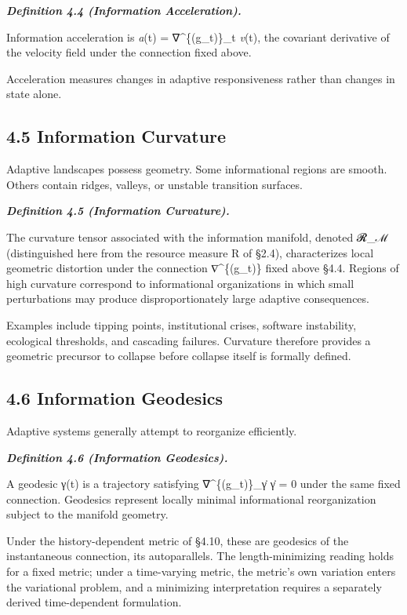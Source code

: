 \documentclass[
]{article}
\begin{document}
\emph{\textbf{Definition 4.4 (Information Acceleration).}}

Information acceleration is \emph{a}(t) = ∇\^{}\{(g\_t)\}\_t
\emph{v}(t), the covariant derivative of the velocity field under the
connection fixed above.

Acceleration measures changes in adaptive responsiveness rather than
changes in state alone.

\hypertarget{information-curvature}{%
\subsection{4.5 Information Curvature}\label{information-curvature}}

Adaptive landscapes possess geometry. Some informational regions are
smooth. Others contain ridges, valleys, or unstable transition surfaces.

\emph{\textbf{Definition 4.5 (Information Curvature).}}

The curvature tensor associated with the information manifold, denoted
𝓡\_ℳ (distinguished here from the resource measure R of §2.4),
characterizes local geometric distortion under the connection
∇\^{}\{(g\_t)\} fixed above §4.4. Regions of high curvature correspond
to informational organizations in which small perturbations may produce
disproportionately large adaptive consequences.

Examples include tipping points, institutional crises, software
instability, ecological thresholds, and cascading failures. Curvature
therefore provides a geometric precursor to collapse before collapse
itself is formally defined.

\hypertarget{information-geodesics}{%
\subsection{4.6 Information Geodesics}\label{information-geodesics}}

Adaptive systems generally attempt to reorganize efficiently.

\emph{\textbf{Definition 4.6 (Information Geodesics).}}

A geodesic γ(t) is a trajectory satisfying ∇\^{}\{(g\_t)\}\_γ̇ γ̇ = 0
under the same fixed connection. Geodesics represent locally minimal
informational reorganization subject to the manifold geometry.

Under the history-dependent metric of §4.10, these are geodesics of the
instantaneous connection, its autoparallels. The length-minimizing
reading holds for a fixed metric; under a time-varying metric, the
metric's own variation enters the variational problem, and a minimizing
interpretation requires a separately derived time-dependent formulation.
\end{document}
